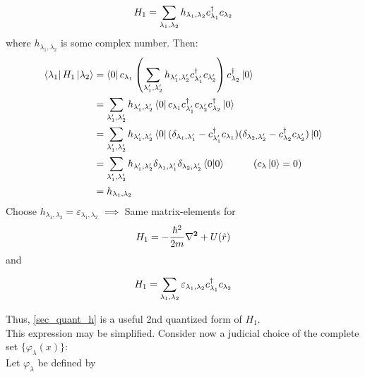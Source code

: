 \begin{equation}
	H_1 = \sum_{\lambda_1, \lambda_2} h_{\lambda_1, \lambda_2} c^{\dagger}_{\lambda_1} c_{\lambda_2}
\end{equation}
where $ h_{\lambda_1, \lambda_2}$ is some complex number.
Then:
\begin{align}
	\bra{\lambda_1} H_1 \ket{\lambda_2} &= \bra{0}c_{\lambda_1} \left(\sum_{\lambda'_1, \lambda'_2} h_{\lambda'_1, \lambda'_2} c^{\dagger}_{\lambda'_1} c_{\lambda'_2} \right) c^{\dagger}_{\lambda_2} \ket{0} \\
	&=\sum_{\lambda'_1, \lambda'_2} h_{\lambda'_1, \lambda'_2}  \bra{0}c_{\lambda_1}  c^{\dagger}_{\lambda'_1} c_{\lambda'_2} c^{\dagger}_{\lambda_2} \ket{0} \nonumber \\
	&= \sum_{\lambda'_1, \lambda'_2} h_{\lambda'_1, \lambda'_2}  \bra{0} (\delta_{\lambda_1, \lambda'_1}-c^{\dagger}_{\lambda'_1}c_{\lambda_1} ) (\delta_{\lambda_2, \lambda'_2} -c^{\dagger}_{\lambda_2} c_{\lambda'_2}) \ket{0} \nonumber\\
	&= \sum_{\lambda'_1, \lambda'_2} h_{\lambda'_1, \lambda'_2}  \delta_{\lambda_1, \lambda'_1} \delta_{\lambda_2, \lambda'_2} \braket{0}{0}\nonumber \hspace{1cm} (c_\lambda \ket{0} =0)  \\
	&= h_{\lambda_1, \lambda_2} \nonumber
\end{align}
Choose $ h_{\lambda_1, \lambda_2} = \varepsilon_{\lambda_1, \lambda_2}$ $\implies$ Same matrix-elements for
\begin{equation}
	H_1 = -\frac{\hbar^2}{2m} \vb{\laplacian}+ U(\hat{r}) 
\end{equation}
and
\begin{tcolorbox}
	\begin{equation}
		H_1 = \sum_{\lambda_1, \lambda_2} \varepsilon_{\lambda_1, \lambda_2} c^{\dagger}_{\lambda_1} c_{\lambda_2} \label{sec_quant_h}
	\end{equation}
\end{tcolorbox}
Thus, \ref{sec_quant_h} is a useful 2nd quantized form of $H_1$.\\
\linebreak
\noindent This expression may be simplified. Consider now a judicial choice of the complete set $\{\varphi_\lambda(x) \}$:\\
\noindent Let ${\varphi_\lambda}$ be defined by

